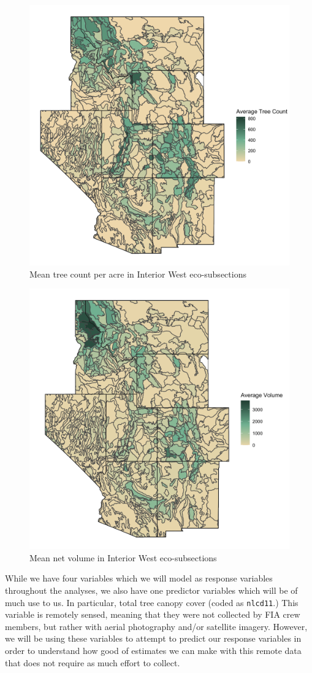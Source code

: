 \documentclass[12pt,twoside]{reedthesis}
\begin{document}
\begin{figure}

{\centering \includegraphics[width=0.65\linewidth]{figure/count} 

}

\caption{Mean tree count per acre in Interior West eco-subsections}\label{fig:unnamed-chunk-7}
\end{figure}
\begin{figure}

{\centering \includegraphics[width=0.65\linewidth]{figure/voln} 

}

\caption{Mean net volume in Interior West eco-subsections}\label{fig:unnamed-chunk-8}
\end{figure}
While we have four variables which we will model as response variables throughout the analyses, we also have one predictor variables which will be of much use to us. In particular, total tree canopy cover (coded as \texttt{nlcd11}.) This variable is remotely sensed, meaning that they were not collected by FIA crew members, but rather with aerial photography and/or satellite imagery. However, we will be using these variables to attempt to predict our response variables in order to understand how good of estimates we can make with this remote data that does not require as much effort to collect.
\end{document}
